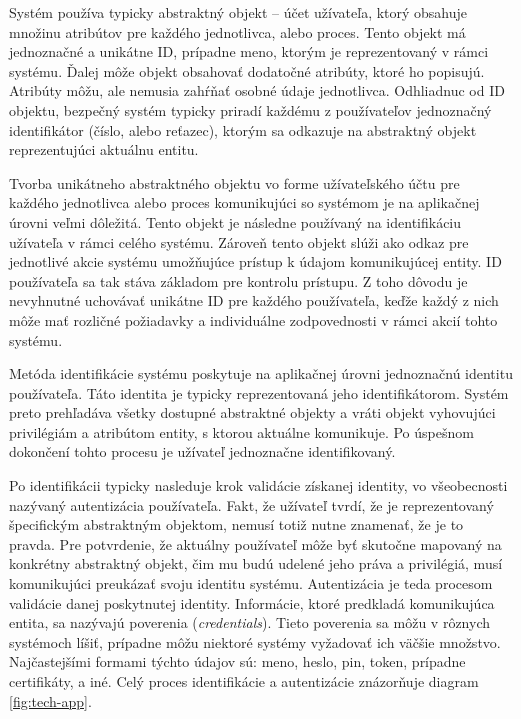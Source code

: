 \documentclass[
  digital, %
  table,   %
  lof,     %
  nolot,   %
  nocover
]{fithesis3}
\begin{document}
Systém používa typicky
abstraktný objekt -- účet užívateľa, ktorý obsahuje množinu atribútov pre
každého jednotlivca, alebo proces. Tento objekt má jednoznačné a unikátne
ID, prípadne meno, ktorým je reprezentovaný v rámci systému. Ďalej môže objekt
obsahovať dodatočné atribúty, ktoré ho popisujú. Atribúty môžu, ale nemusia
zahŕňať osobné údaje jednotlivca. Odhliadnuc od ID objektu, bezpečný systém
typicky priradí každému z používateľov jednoznačný identifikátor (číslo, alebo
reťazec), ktorým sa odkazuje na abstraktný objekt reprezentujúci aktuálnu
entitu. 

Tvorba unikátneho abstraktného objektu vo forme užívateľského účtu
pre každého jednotlivca alebo proces komunikujúci so systémom je na aplikačnej
úrovni veľmi dôležitá. Tento objekt je následne používaný na identifikáciu
užívateľa v rámci celého systému. Zároveň tento objekt slúži ako odkaz pre
jednotlivé akcie systému umožňujúce prístup k údajom komunikujúcej entity.
ID používateľa sa tak stáva základom pre kontrolu prístupu. Z toho dôvodu je 
nevyhnutné uchovávať unikátne ID pre každého používateľa, keďže každý z nich
môže mať rozličné požiadavky a individuálne zodpovednosti v rámci akcií tohto
systému.

Metóda identifikácie systému poskytuje na aplikačnej úrovni jednoznačnú
identitu používateľa. Táto identita je typicky reprezentovaná jeho
identifikátorom. Systém preto prehľadáva všetky dostupné abstraktné objekty a
vráti objekt vyhovujúci privilégiám a atribútom entity, s ktorou aktuálne
komunikuje. Po úspešnom dokončení tohto procesu je užívateľ jednoznačne
identifikovaný.

Po identifikácii typicky nasleduje krok validácie získanej identity,
vo všeobecnosti nazývaný autentizácia používateľa. Fakt, že užívateľ tvrdí,
že je reprezentovaný špecifickým abstraktným objektom, nemusí totiž nutne
znamenať, že je to pravda. Pre potvrdenie, že aktuálny používateľ môže byť
skutočne mapovaný na konkrétny abstraktný objekt, čim mu budú udelené jeho
práva a privilégiá, musí komunikujúci preukázať svoju identitu systému.
Autentizácia je teda procesom validácie danej poskytnutej identity. Informácie,
ktoré predkladá komunikujúca entita, sa nazývajú poverenia
(\textit{credentials}). Tieto poverenia sa môžu v rôznych systémoch líšiť, 
prípadne môžu niektoré systémy vyžadovať ich väčšie množstvo. Najčastejšími
formami týchto údajov sú: meno, heslo, pin, token, prípadne certifikáty, a iné.
Celý proces identifikácie a autentizácie znázorňuje diagram \ref{fig:tech-app}.
\end{document}
